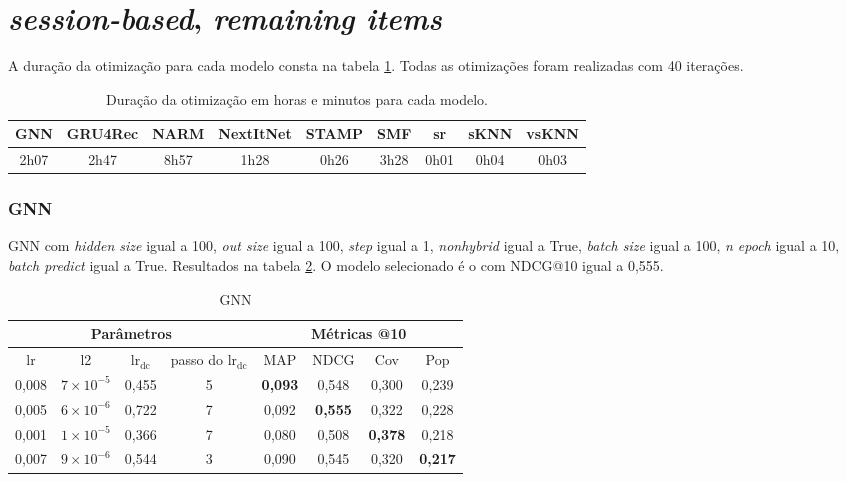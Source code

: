 \section{\textit{session-based}, \textit{remaining items}}

A duração da otimização para cada modelo consta na tabela
\ref{tab:duration_opt_remaining}. Todas as otimizações foram realizadas com
40 iterações.

\begin{table}[htbp]
  \centering
  \begin{tabular}{|c|c|c|c|c|c|c|c|c|}
      \hline
      GNN & GRU4Rec & NARM & NextItNet & STAMP & SMF & sr & sKNN & vsKNN \\
      \hline
      2h07 & 2h47 & 8h57 & 1h28 & 0h26 & 3h28 & 0h01 & 0h04 & 0h03 \\
      \hline
      \end{tabular}
      \caption{Duração da otimização em horas e minutos para cada modelo.}
      \label{tab:duration_opt_remaining}
\end{table}

\subsubsection{GNN}
GNN com \textit{hidden size} igual a 100, \textit{out size} igual a 100,
\textit{step} igual a 1, \textit{nonhybrid} igual a True, \textit{batch size}
igual a 100, \textit{n epoch} igual a 10, \textit{batch predict} igual a True.
Resultados na tabela \ref{opt:GNN_rem}. O modelo selecionado é o com NDCG@10 igual a 0,555.

\begin{table}[htbp]
  \centering
  \begin{tabular}{|c|c|c|c|c|c|c|c|}
    \hline
      \multicolumn{4}{|c|}{Parâmetros} & \multicolumn{4}{c|}{Métricas @10} \\
      \hline
      lr & l2 & $\text{lr}_\text{dc}$ &passo do $\text{lr}_\text{dc}$ & MAP & NDCG & Cov & Pop \\
      \hline
      0,008 & $7 \times 10^{-5}$ & 0,455 & 5 & \textbf{0,093} & 0,548 & 0,300 & 0,239 \\
      \hline
      0,005 & $6 \times 10^{-6}$ & 0,722 & 7 & 0,092 & \textbf{0,555} & 0,322 & 0,228 \\
      \hline
      0,001 & $1 \times 10^{-5}$ & 0,366 & 7 & 0,080 & 0,508 & \textbf{0,378} & 0,218 \\
      \hline
      0,007 & $9 \times 10^{-6}$ & 0,544 & 3 & 0,090 & 0,545 & 0,320 & \textbf{0,217} \\
      \hline
\end{tabular}
      \caption{GNN}
      \label{opt:GNN_rem}
\end{table}

